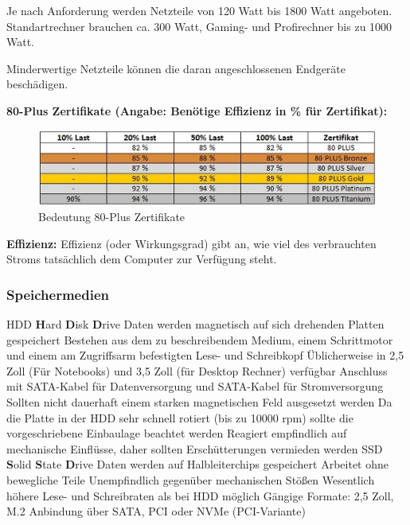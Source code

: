 \documentclass[10pt]{article}
\begin{document}
\begin{flushleft}
Je nach Anforderung werden Netzteile von 120 Watt bis 1800 Watt angeboten. Standartrechner brauchen ca. 300 Watt, Gaming- und Profirechner bis zu 1000 Watt.

Minderwertige Netzteile können die daran angeschlossenen Endgeräte beschädigen.

\textbf{80-Plus Zertifikate (Angabe: Benötige Effizienz in \% für Zertifikat):}

\begin{figure}[H]
    \centering
    \includegraphics{80plus.jpg}
    \caption{Bedeutung 80-Plus Zertifikate}
\end{figure}

\textbf{Effizienz:}
Effizienz (oder Wirkungsgrad) gibt an, wie viel des verbrauchten Stroms tatsächlich dem Computer zur Verfügung steht.


\subsubsection{Speichermedien}

\begin{outline}
    \1 HDD
        \2 \textbf{H}ard \textbf{D}isk \textbf{D}rive
        \2 Daten werden magnetisch auf sich drehenden Platten gespeichert
        \2 Bestehen aus dem zu beschreibendem Medium, einem Schrittmotor und einem am Zugriffsarm befestigten Lese- und Schreibkopf
        \2 Üblicherweise in 2,5 Zoll (Für Notebooks) und 3,5 Zoll (für Desktop Rechner) verfügbar
        \2 Anschluss mit SATA-Kabel für Datenversorgung und SATA-Kabel für Stromversorgung
        \2 Sollten nicht dauerhaft einem starken magnetischen Feld ausgesetzt werden
        \2 Da die Platte in der HDD sehr schnell rotiert (bis zu 10000 rpm) sollte die vorgeschriebene Einbaulage beachtet werden
        \2 Reagiert empfindlich auf mechanische Einflüsse, daher sollten Erschütterungen vermieden werden
    \1 SSD
        \2 \textbf{S}olid \textbf{S}tate \textbf{D}rive
        \2 Daten werden auf Halbleiterchips gespeichert
        \2 Arbeitet ohne bewegliche Teile
        \2 Unempfindlich gegenüber mechanischen Stößen
        \2 Wesentlich höhere Lese- und Schreibraten als bei HDD möglich
        \2 Gängige Formate: 2,5 Zoll, M.2
        \2 Anbindung über SATA, PCI oder NVMe (PCI-Variante)
\end{outline}


\end{flushleft}
\end{document}
